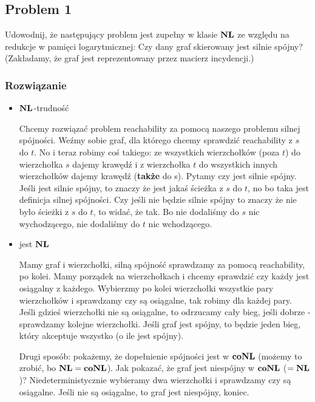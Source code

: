 \subsection{Problem 1}
Udowodnij, że następujący problem jest zupełny w klasie $\textbf{NL}$ ze względu na redukcje w pamięci logarytmicznej: Czy dany graf skierowany jest silnie spójny? (Zakładamy, że graf jest reprezentowany przez macierz incydencji.)

\subsubsection*{Rozwiązanie}

\begin{itemize}
    \item $\textbf{NL}$-trudność
    
    Chcemy rozwiązać problem reachability za pomocą naszego problemu silnej spójności. Weźmy sobie graf, dla którego chcemy sprawdzić reachability z $s$ do $t$. No i teraz robimy coś takiego: ze wszystkich wierzchołków (poza $t$) do wierzchołka $s$ dajemy krawędź i z wierzchołka $t$ do wszystkich innych wierzchołków dajemy krawędź (\textbf{także} do s). Pytamy czy jest silnie spójny. Jeśli jest silnie spójny, to znaczy że jest jakaś ścieżka z $s$ do $t$, no bo taka jest definicja silnej spójności. Czy jeśli nie będzie silnie spójny to znaczy że nie było ścieżki z $s$ do $t$, to widać, że tak. Bo nie dodaliśmy do $s$ nic wychodzącego, nie dodaliśmy do $t$ nic wchodzącego. 
    
    
    \item jest $\textbf{NL}$
    
    Mamy graf i wierzchołki, silną spójność sprawdzamy za pomocą reachability, po kolei. Mamy porządek na wierzchołkach i chcemy sprawdzić czy każdy jest osiągalny z każdego. Wybierzmy po kolei wierzchołki wszystkie pary wierzchołków i sprawdzamy czy są osiągalne, tak robimy dla każdej pary. Jeśli gdzieś wierzchołki nie są osiągalne, to odrzucamy cały bieg, jeśli dobrze - sprawdzamy kolejne wierzchołki. Jeśli graf jest spójny, to będzie jeden bieg, który akceptuje wszystko (o ile jest spójny).
    
    Drugi sposób: pokażemy, że dopełnienie spójności jest w $\textbf{co}\textbf{NL}$ (możemy to zrobić, bo $\textbf{NL} = \textbf{co}\textbf{NL}$). Jak pokazać, że graf jest niespójny w $\textbf{co}\textbf{NL}$ ($=\textbf{NL}$)? Niedeterministycznie wybieramy dwa wierzchołki i sprawdzamy czy są osiągalne. Jeśli nie są osiągalne, to graf jest niespójny, koniec. 
    
\end{itemize}

